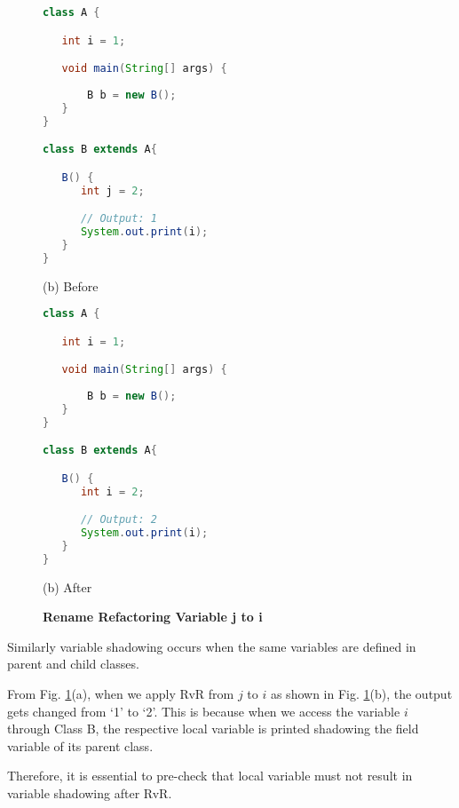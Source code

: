 \begin{figure}[th]
\centering
\begin{minipage}[t]{0.47\linewidth}
\begin{lstlisting}[language=java, basicstyle=\scriptsize\ttfamily,frame=single]
class A {

   int i = 1;

   void main(String[] args) {
		
       B b = new B(); 
   }
}

class B extends A{

   B() {    	
      int j = 2;

      // Output: 1
      System.out.print(i); 
   }
}
\end{lstlisting}
\centering(b) Before 
\end{minipage}
\hfill
\begin{minipage}[t]{0.47\linewidth}
\begin{lstlisting}[language=java, basicstyle=\scriptsize\ttfamily,frame=single]
class A {

   int i = 1;

   void main(String[] args) {
		
       B b = new B(); 
   }
}

class B extends A{

   B() {
      int i = 2;

      // Output: 2
      System.out.print(i); 
   }
}
\end{lstlisting}
\centering(b) After 
\end{minipage}
\caption{\textbf{Rename Refactoring Variable j to i}}
\label{figure:precond5_4}
\end{figure}


Similarly variable shadowing occurs when the same variables are defined in parent and child classes.

From Fig. \ref{figure:precond5_4}(a), when we apply RvR from $j$ to $i$ as shown in Fig. \ref{figure:precond5_4}(b), the output gets changed from `1' to `2'. This is because when we access the variable $i$ through Class B, the respective local variable is printed shadowing the field variable of its parent class.

Therefore, it is essential to pre-check that local variable must not result in variable shadowing after RvR.